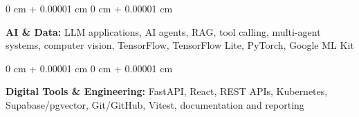 \documentclass[10pt, letterpaper]{article}
\newenvironment{onecolentry}{
    \begin{adjustwidth}{
        0 cm + 0.00001 cm
    }{
        0 cm + 0.00001 cm
    }
}{
    \end{adjustwidth}
} %
\begin{document}
        \vspace{0.12 cm}

        \begin{onecolentry}
            \textbf{AI \& Data:} LLM applications, AI agents, RAG, tool calling, multi-agent systems, computer vision, TensorFlow, TensorFlow Lite, PyTorch, Google ML Kit
        \end{onecolentry}

        \vspace{0.12 cm}

        \begin{onecolentry}
            \textbf{Digital Tools \& Engineering:} FastAPI, React, REST APIs, Kubernetes, Supabase/pgvector, Git/GitHub, Vitest, documentation and reporting
        \end{onecolentry}
\end{document}
